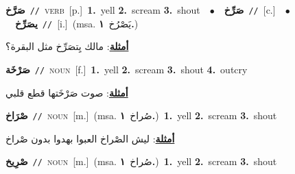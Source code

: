 \documentclass[10pt,a4paper,twoside]{article} %
\begin{document}
\begin{multicols}{2}
{\setlength\topsep{0pt}\textbf{\foreignlanguage{arabic}{صَرَّخ}}\ {\color{gray}\texttt{//}\color{black}}\ \textsc{verb}\ [p.]\ \textbf{1.}~yell  \textbf{2.}~scream  \textbf{3.}~shout\ \ $\bullet$\ \ \setlength\topsep{0pt}\textbf{\foreignlanguage{arabic}{صَرِّخ}}\ {\color{gray}\texttt{//}\color{black}}\ [c.]\ \ $\bullet$\ \ \setlength\topsep{0pt}\textbf{\foreignlanguage{arabic}{يصَرِّخ}}\ {\color{gray}\texttt{//}\color{black}}\ [i.]\ \color{gray}(msa. \foreignlanguage{arabic}{يَصْرُخ}~\foreignlanguage{arabic}{\textbf{١.}})\color{black}\  \begin{flushright}\color{gray}\foreignlanguage{arabic}{\textbf{\underline{\foreignlanguage{arabic}{أمثلة}}}: مالك يِتصَرِّخ مثل البقرة؟}\end{flushright}\color{black}} \vspace{2mm}

{\setlength\topsep{0pt}\textbf{\foreignlanguage{arabic}{صَرْخَة}}\ {\color{gray}\texttt{//}\color{black}}\ \textsc{noun}\ [f.]\ \textbf{1.}~yell  \textbf{2.}~scream  \textbf{3.}~shout  \textbf{4.}~outcry\  \begin{flushright}\color{gray}\foreignlanguage{arabic}{\textbf{\underline{\foreignlanguage{arabic}{أمثلة}}}: صوت صَرْخَتها قطع قلبي}\end{flushright}\color{black}} \vspace{2mm}

{\setlength\topsep{0pt}\textbf{\foreignlanguage{arabic}{صْرَاخ}}\ {\color{gray}\texttt{//}\color{black}}\ \textsc{noun}\ [m.]\ \color{gray}(msa. \foreignlanguage{arabic}{صُراخ}~\foreignlanguage{arabic}{\textbf{١.}})\color{black}\ \textbf{1.}~yell  \textbf{2.}~scream  \textbf{3.}~shout\  \begin{flushright}\color{gray}\foreignlanguage{arabic}{\textbf{\underline{\foreignlanguage{arabic}{أمثلة}}}: ليش الصْراخ العبوا بهدوا بدون صْراخ}\end{flushright}\color{black}} \vspace{2mm}

{\setlength\topsep{0pt}\textbf{\foreignlanguage{arabic}{صْرِيخ}}\ {\color{gray}\texttt{//}\color{black}}\ \textsc{noun}\ [m.]\ \color{gray}(msa. \foreignlanguage{arabic}{صُراخ}~\foreignlanguage{arabic}{\textbf{١.}})\color{black}\ \textbf{1.}~yell  \textbf{2.}~scream  \textbf{3.}~shout\ } \vspace{2mm}


\end{multicols}
\end{document}
